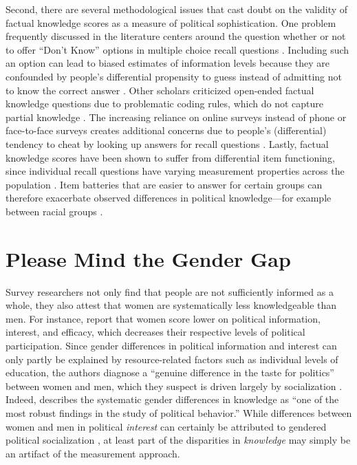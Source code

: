 Second, there are several methodological issues that cast doubt on the validity of factual knowledge scores as a measure of political sophistication. One problem frequently discussed in the literature centers around the question whether or not to offer ``Don't Know'' options in multiple choice recall questions \citep{mondak2000reconsidering,mondak2001asked,miller2008experimenting}. Including such an option can lead to biased estimates of information levels because they are confounded by people's differential propensity to guess instead of admitting not to know the correct answer \citep[but see][]{luskin2011don}. Other scholars criticized open-ended factual knowledge questions due to problematic coding rules, which do not capture partial knowledge \citep{krosnick2008problems,gibson2009knowing,debell2013harder}. The increasing reliance on online surveys instead of phone or face-to-face surveys creates additional concerns due to people's (differential) tendency to cheat by looking up answers for recall questions \citep{clifford2016cheating,hohne2021looking,style2021does}. Lastly, factual knowledge scores have been shown to suffer from differential item functioning, since individual recall questions have varying measurement properties across the population \citep{pietryka2013analysis}. Item batteries that are easier to answer for certain groups can therefore exacerbate observed differences in political knowledge---for example between racial groups \citep{abrajano2014reexamining}.


\section*{Please Mind the Gender Gap}

Survey researchers not only find that people are not sufficiently informed as a whole, they also attest that women are systematically less knowledgeable than men. For instance, \citet{verba1997knowing} report that women score lower on political information, interest, and efficacy, which decreases their respective levels of political participation. Since gender differences in political information and interest can only partly be explained by resource-related factors such as individual levels of education, the authors diagnose a ``genuine difference in the taste for politics'' between women and men, which they suspect is driven largely by socialization \citep[see also][]{wolak2011roots}. Indeed, \citet[117]{dow2009gender} describes the systematic gender differences in knowledge as ``one of the most robust findings in the study of political behavior.'' While differences between women and men in political \textit{interest} can certainly be attributed to gendered political socialization \citep{bos2021one,wolak2020self}, at least part of the disparities in \textit{knowledge} may simply be an artifact of the measurement approach.


